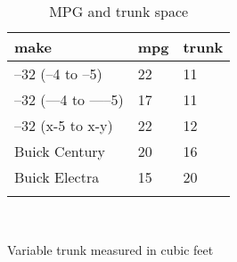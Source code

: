 \documentclass{article}
\begin{document}
\begin{table}[tbp] \centering
{}

\caption{MPG and trunk space}
\begin{tabularx}{\linewidth}{@{}lCC@{}}

\toprule
{make}&{mpg}&{trunk} \tabularnewline
\midrule \addlinespace[\belowrulesep]
--32 (--4 to --5)&22&11 \tabularnewline
--32 (---4 to -----5)&17&11 \tabularnewline
--32 (x-5 to x-y)&22&12 \tabularnewline
Buick Century&20&16 \tabularnewline
Buick Electra&15&20 \tabularnewline
\bottomrule \addlinespace[\belowrulesep]

\end{tabularx}
\\ \parbox{\linewidth}{\footnotesize Variable trunk measured in cubic feet}
\end{table}
\end{document}

